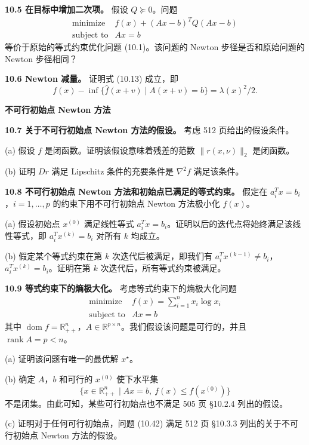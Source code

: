\documentclass[UTF8, 12pt, fontset=fandol, oneside]{ctexart}
\begin{document}
\noindent\textbf{10.5 在目标中增加二次项。}\quad
假设 $Q\succeq0$。问题
\[
\begin{array}{ll}
\mbox{minimize} & f(x)+(Ax-b)^TQ(Ax-b)\\
\mbox{subject to} & Ax=b
\end{array}
\]
等价于原始的等式约束优化问题 (10.1)。该问题的 Newton 步径是否和原始问题的 Newton 步径相同？

\noindent\textbf{10.6 Newton 减量。}\quad
证明式 (10.13) 成立，即
\[
f(x)-\inf\{\hat f(x+v)\mid A(x+v)=b\}=\lambda(x)^2/2.
\]

\noindent\textbf{不可行初始点 Newton 方法}

\noindent\textbf{10.7 关于不可行初始点 Newton 方法的假设。}\quad
考虑 512 页给出的假设条件。

(a) 假设 $f$ 是闭函数。证明该假设意味着残差的范数 $\|r(x,\nu)\|_2$ 是闭函数。

(b) 证明 $Dr$ 满足 Lipschitz 条件的充要条件是 $\nabla^2 f$ 满足该条件。

\noindent\textbf{10.8 不可行初始点 Newton 方法和初始点已满足的等式约束。}\quad
假定在 $a_i^Tx=b_i$，$i=1,\ldots,p$ 的约束下用不可行初始点 Newton 方法极小化 $f(x)$。

(a) 假设初始点 $x^{(0)}$ 满足线性等式 $a_i^Tx=b_i$。证明以后的迭代点将始终满足该线性等式，即 $a_i^Tx^{(k)}=b_i$ 对所有 $k$ 均成立。

(b) 假定某个等式约束在第 $k$ 次迭代后被满足，即我们有 $a_i^Tx^{(k-1)}\neq b_i$，$a_i^Tx^{(k)}=b_i$。证明在第 $k$ 次迭代后，所有等式约束被满足。

\noindent\textbf{10.9 等式约束下的熵极大化。}\quad
考虑等式约束下的熵极大化问题
\begin{equation}
\begin{array}{ll}
\mbox{minimize} & f(x)=\displaystyle\sum_{i=1}^n x_i\log x_i\\
\mbox{subject to} & Ax=b
\end{array}
\tag{10.42}
\end{equation}
其中 $\operatorname{dom} f=\mathbb{R}_{++}^n$，$A\in\mathbb{R}^{p\times n}$。我们假设该问题是可行的，并且 $\operatorname{rank}A=p<n$。

(a) 证明该问题有唯一的最优解 $x^\star$。

(b) 确定 $A$，$b$ 和可行的 $x^{(0)}$ 使下水平集
\[
\{x\in\mathbb{R}_{++}^n\mid Ax=b,\ f(x)\leq f(x^{(0)})\}
\]
不是闭集。由此可知，某些可行初始点也不满足 505 页 \S10.2.4 列出的假设。

(c) 证明对于任何可行初始点，问题 (10.42) 满足 512 页 \S10.3.3 列出的关于不可行初始点 Newton 方法的假设。
\end{document}
